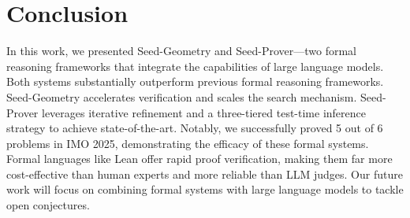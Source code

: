 \section{Conclusion}
In this work, we presented Seed-Geometry and Seed-Prover---two formal reasoning frameworks that integrate the capabilities of large language models. Both systems substantially outperform previous formal reasoning frameworks. Seed-Geometry accelerates verification and scales the search mechanism. Seed-Prover leverages iterative refinement and a three-tiered test-time inference strategy to achieve state-of-the-art. Notably, we successfully proved 5 out of 6 problems in IMO 2025, demonstrating the efficacy of these formal systems. Formal languages like Lean offer rapid proof verification, making them far more cost-effective than human experts and more reliable than LLM judges. Our future work will focus on combining formal systems with large language models to tackle open conjectures.

